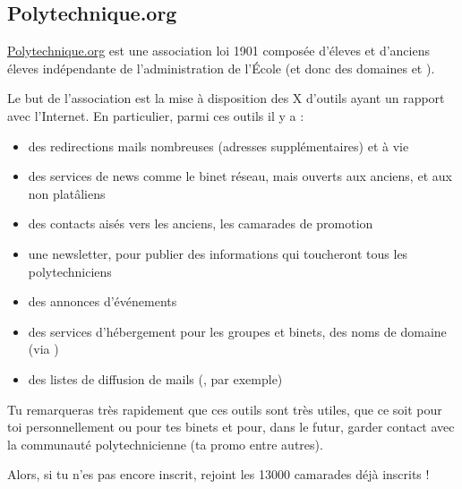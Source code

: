 \subsection{Polytechnique.org}
\url{Polytechnique.org} est une association loi 1901 compos\'ee d'\'eleves et d'anciens \'eleves 
 ind\'ependante de l'administration de l'\'Ecole (et donc des domaines 
 et ).

Le but de l'association est la mise \`a disposition des X d'outils ayant un rapport avec l'Internet. En particulier, parmi ces outils il y a :
\begin{itemize}
  \item des redirections mails nombreuses (adresses suppl\'ementaires) et \`a vie
  \item des services de news comme le binet r\'eseau, mais ouverts aux anciens, et aux non plat\^aliens
  \item des contacts ais\'es vers les anciens, les camarades de promotion
  \item une newsletter, pour publier des informations qui toucheront tous les polytechniciens
  \item des annonces d'\'ev\'enements
  \item des services d'h\'ebergement pour les groupes et binets, des noms de domaine (via )
  \item des listes de diffusion de mails (, par exemple)
\end{itemize}

Tu remarqueras tr\`es rapidement que ces outils sont tr\`es utiles, que ce soit pour toi personnellement ou pour tes binets et pour, dans le futur, garder contact avec la communaut\'e polytechnicienne (ta promo entre autres).

Alors, si tu n'es pas encore inscrit, rejoint les 13000 camarades d\'ej\`a inscrits !
